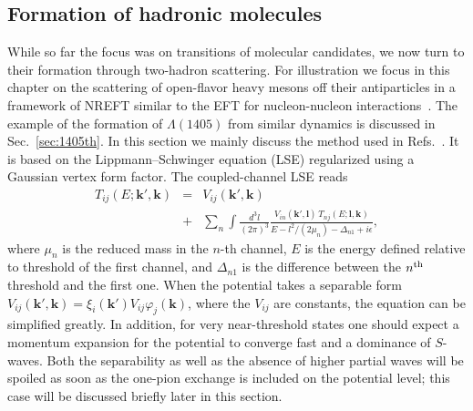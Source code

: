 \subsection{Formation of hadronic molecules}
\label{sec:4-interactions}

While so far the focus was on transitions of molecular candidates, we now 
turn to their formation through two-hadron scattering. 
For illustration we focus in this chapter on the scattering of open-flavor heavy
mesons off their antiparticles in a framework of  
NREFT similar to the EFT for nucleon-nucleon 
interactions~\cite{Epelbaum:2008ga}. 
The example of the formation of $\Lambda(1405)$ from
similar dynamics is discussed in Sec.~\ref{sec:1405th}.
In this section we mainly discuss the method used in 
Refs.~\cite{Nieves:2011vw,Nieves:2012tt,Valderrama:2012jv,
HidalgoDuque:2012pq,Guo:2013sya,Guo:2013xga}. It is based on the 
Lippmann--Schwinger equation (LSE) regularized using a Gaussian vertex form 
factor. The coupled-channel LSE 
reads 
\begin{eqnarray}
      T_{ij}(E;\bm k',\bm k) &=& V_{ij}(\bm k', \bm k) \\
    &+&  \sum_n \int\! \frac{d^3l}{(2\pi)^3} 
\frac{ V_{in}(\bm{k}',\bm{l})\, T_{nj}(E;\bm l, \bm k)  }{  
E-l^2/(2\mu_{n}) - \Delta_{n1} + i\epsilon  }, \nonumber
 \label{eq:lse}
\end{eqnarray}
where $\mu_{n}$ is the reduced mass in the $n$-th channel, $E$ is the 
energy defined relative to threshold of the first channel, and $\Delta_{n1}$ is 
the difference between the $n^{\rm th}$ threshold and the first one. When the 
potential takes a separable form $V_{ij}(\bm k', 
\bm k)=\xi_{i}{(\bm k')}V_{ij}\varphi_{j}{(\bm k)}$, where the $V_{ij}$ are 
constants, the equation can be  
simplified greatly. In addition, for very near-threshold states one should 
expect a momentum 
expansion for the potential to converge fast and a dominance of $S$-waves. 
Both the separability as well as the absence of higher partial waves will be 
spoiled as soon as the one-pion exchange is included on the potential level;
this case will be discussed briefly later in this section.


